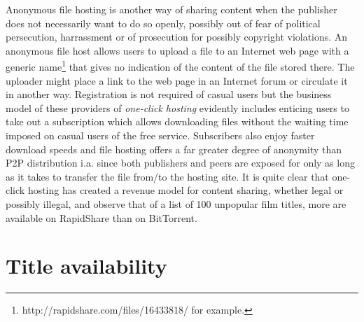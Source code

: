 \documentclass[12pt,english]{apa6}
\begin{document}
Anonymous file hosting is another way of sharing content when the
publisher does not necessarily want to do so openly, possibly out
of fear of political persecution, harrassment or of prosecution for
possibly copyright violations. An anonymous file host allows users
to upload a file to an Internet web page with a generic name\footnote{http://rapidshare.com/files/16433818/ for example.} that gives no indication of the content of the file stored there.
The uploader might place a link to the web page in an Internet forum
or circulate it in another way. Registration is not required of casual
users but the business model of these providers of \emph{one-click
hosting} evidently includes enticing users to take out a subscription
which allows downloading files without the waiting time imposed on
casual users of the free service. Subscribers also enjoy faster download
speeds and file hosting offers a far greater degree of anonymity than
P2P distribution \citep{le_blond_angling_2010,le_blond_spyingworldyour_2010}
i.a. since both publishers and peers are exposed for only as long
as it takes to transfer the file from/to the hosting site. It is quite
clear that one-click hosting has created a revenue model for content
sharing, whether legal or possibly illegal, and \citet{antoniades_one-click_2009}
observe that of a list of 100 unpopular film titles, more are available
on RapidShare than on BitTorrent.


\section{Title availability}
\end{document}
